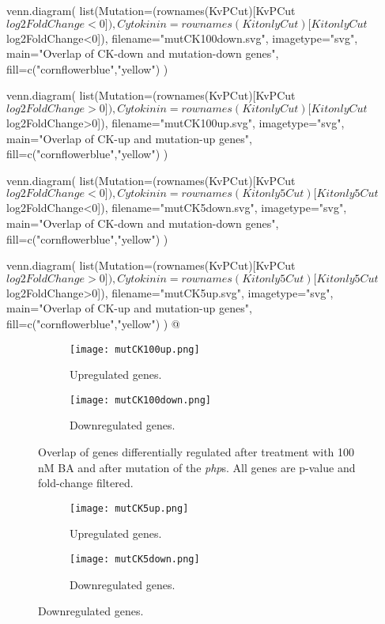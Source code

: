 \documentclass{article}
\begin{document}
{{{{	
	
	
venn.diagram(
	list(Mutation=(rownames(KvPCut)[KvPCut$log2FoldChange<0]),
		Cytokinin=rownames(KitonlyCut)[KitonlyCut$log2FoldChange<0]),
	filename="mutCK100down.svg",
	imagetype="svg",
	main="Overlap of CK-down and mutation-down genes",
	fill=c("cornflowerblue","yellow")
	)

venn.diagram(
	list(Mutation=(rownames(KvPCut)[KvPCut$log2FoldChange>0]),
		Cytokinin=rownames(KitonlyCut)[KitonlyCut$log2FoldChange>0]),
	filename="mutCK100up.svg",
	imagetype="svg",
	main="Overlap of CK-up and mutation-up genes",
	fill=c("cornflowerblue","yellow")
	)

venn.diagram(
	list(Mutation=(rownames(KvPCut)[KvPCut$log2FoldChange<0]),
		Cytokinin=rownames(Kitonly5Cut)[Kitonly5Cut$log2FoldChange<0]),
	filename="mutCK5down.svg",
	imagetype="svg",
	main="Overlap of CK-down and mutation-down genes",
	fill=c("cornflowerblue","yellow")
	)

venn.diagram(
	list(Mutation=(rownames(KvPCut)[KvPCut$log2FoldChange>0]),
		Cytokinin=rownames(Kitonly5Cut)[Kitonly5Cut$log2FoldChange>0]),
	filename="mutCK5up.svg",
	imagetype="svg",
	main="Overlap of CK-up and mutation-up genes",
	fill=c("cornflowerblue","yellow")
	)
@


\begin{figure}
	\begin{subfigure}{0.49\linewidth}
		\texttt{[image: mutCK100up.png]}
		\caption{Upregulated genes.}
		\label{fig:100nMmutoverlapA}
	\end{subfigure}
	\begin{subfigure}{0.49\linewidth}
		\texttt{[image: mutCK100down.png]}
		\caption{Downregulated genes.}
		\label{fig:100nMmutoverlapB}
	\end{subfigure}
	
	\caption{Overlap of genes differentially regulated after treatment with 100 nM BA and after mutation of the \textit{php}s. All genes are p-value and fold-change filtered.}
	\label{fig:100nMmutoverlap}
\end{figure}


\begin{figure}
	\begin{subfigure}{0.49\linewidth}
		\texttt{[image: mutCK5up.png]}
		\caption{Upregulated genes.}
		\label{fig:5uMmutoverlapA}
	\end{subfigure}
	\begin{subfigure}{0.49\linewidth}
		\texttt{[image: mutCK5down.png]}
		\caption{Downregulated genes.}
		\label{fig:5uMmutoverlapB}
	\end{subfigure}
	

\end{figure}}}}}
\end{document}
